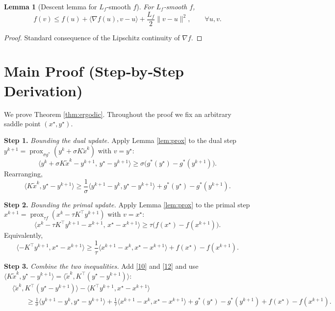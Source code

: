 \documentclass{article}
\newtheorem{lemma}{Lemma}
\newcommand{\prox}{\operatorname{prox}}
\begin{document}
\begin{lemma}[Descent lemma for $L_{f}$‑smooth $f$]\label{lem:descent}
For $L_{f}$‑smooth $f$,
\[
f(v)\le f(u)+\langle\nabla f(u),v-u\rangle+\frac{L_{f}}{2}\|v-u\|^{2},
\qquad\forall u,v.
\tag{8}
\]
\end{lemma}
\begin{proof}
Standard consequence of the Lipschitz continuity of $\nabla f$. \hfill\qedsymbol
\end{proof}

\section*{Main Proof (Step‑by‑Step Derivation)}
We prove Theorem \ref{thm:ergodic}. Throughout the proof we fix an arbitrary saddle point $(x^{\star},y^{\star})$.

\noindent\textbf{Step 1.} \emph{Bounding the dual update.}  
Apply Lemma \ref{lem:prox} to the dual step $y^{k+1}=\prox_{\sigma g^{*}}(y^{k}+\sigma K\tilde{x}^{k})$ with $v=y^{\star}$:
\[
\langle y^{k}+ \sigma K\tilde{x}^{k} - y^{k+1},\, y^{\star}-y^{k+1}\rangle
\ge \sigma\bigl(g^{*}(y^{\star})-g^{*}(y^{k+1})\bigr).
\tag{9}
\]
Rearranging,
\[
\langle K\tilde{x}^{k},y^{\star}-y^{k+1}\rangle
\ge \frac{1}{\sigma}\langle y^{k+1}-y^{k},y^{\star}-y^{k+1}\rangle
+ g^{*}(y^{\star})-g^{*}(y^{k+1}).
\tag{10}
\]

\noindent\textbf{Step 2.} \emph{Bounding the primal update.}  
Apply Lemma \ref{lem:prox} to the primal step $x^{k+1}=\prox_{\tau f}(x^{k}-\tau K^{\top}y^{k+1})$ with $v=x^{\star}$:
\[
\langle x^{k}-\tau K^{\top}y^{k+1}-x^{k+1},\,x^{\star}-x^{k+1}\rangle
\ge \tau\bigl(f(x^{\star})-f(x^{k+1})\bigr).
\tag{11}
\]
Equivalently,
\[
\langle -K^{\top}y^{k+1},x^{\star}-x^{k+1}\rangle
\ge \frac{1}{\tau}\langle x^{k+1}-x^{k},x^{\star}-x^{k+1}\rangle
+ f(x^{\star})-f(x^{k+1}).
\tag{12}
\]

\noindent\textbf{Step 3.} \emph{Combine the two inequalities.}  
Add \eqref{10} and \eqref{12} and use $\langle K\tilde{x}^{k},y^{\star}-y^{k+1}\rangle
= \langle \tilde{x}^{k},K^{\top}(y^{\star}-y^{k+1})\rangle$:
\[
\begin{aligned}
&\langle \tilde{x}^{k},K^{\top}(y^{\star}-y^{k+1})\rangle
-\langle K^{\top}y^{k+1},x^{\star}-x^{k+1}\rangle  \\
&\qquad\ge 
\frac{1}{\sigma}\langle y^{k+1}-y^{k},y^{\star}-y^{k+1}\rangle
+\frac{1}{\tau}\langle x^{k+1}-x^{k},x^{\star}-x^{k+1}\rangle
+ g^{*}(y^{\star})-g^{*}(y^{k+1})
+ f(x^{\star})-f(x^{k+1}).
\end{aligned}
\tag{13}
\]
\end{document}
